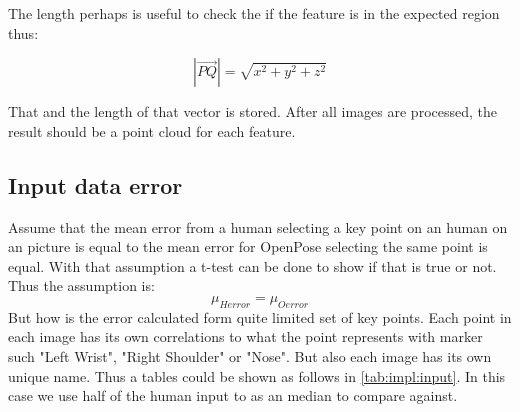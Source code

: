 The length perhaps is useful to check the if the feature is in the expected region thus:

\begin{equation}
    |\overrightarrow{PQ}| = \sqrt{x^2 + y^2 + z^2}
\end{equation}

That and the length of that vector is stored.
After all images are processed, the result should be a point cloud for each feature.

\subsection{Input data error}\label{sub:implment:inputerror}
Assume that the mean error from a human selecting a key point on an human on an picture is equal to the mean error for OpenPose selecting the same point is equal.
With that assumption a t-test can be done to show if that is true or not.
Thus the assumption is:
\[
    \mu_{Herror} = \mu_{Oerror}
\]
But how is the error calculated form quite limited set of key points.
Each point in each image has its own correlations to what the point represents with marker such "Left Wrist", "Right Shoulder" or "Nose".
But also each image has its own unique name.
Thus a tables could be shown as follows in \ref{tab:impl:input}.
In this case we use half of the human input to as an median to compare against.
